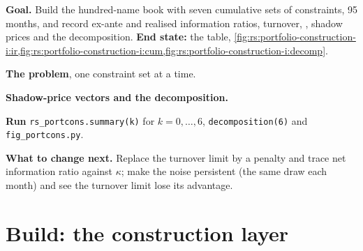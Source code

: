 \begin{tutorial}
\textbf{Goal.} Build the hundred-name book with seven cumulative sets of constraints, 95 months, and record ex-ante and realised information ratios, turnover,
, shadow prices and the decomposition. \textbf{End state:} the table, \cref{fig:rs:portfolio-construction-i:ir,fig:rs:portfolio-construction-i:cum,fig:rs:portfolio-construction-i:decomp}.
\begin{tutsteps}
\item \textbf{The problem}, one constraint set at a time.
\label{lst:rs:portfolio-construction-i:build}
\item \textbf{Shadow-price vectors and the decomposition.}
\label{lst:rs:portfolio-construction-i:decomp}
\item \textbf{Run} \texttt{rs\_portcons.summary(k)} for $k = 0, \dots, 6$, \texttt{decomposition(6)} and \texttt{fig\_portcons.py}.
\end{tutsteps}
\textbf{What to change next.} Replace the turnover limit by a penalty and trace net information ratio against $\kappa$; make the noise persistent (the same
draw each month) and see the turnover limit lose its advantage.
\end{tutorial}

\section{Build: the construction layer}\label{bld:rs:portfolio-construction-i:portcons}

